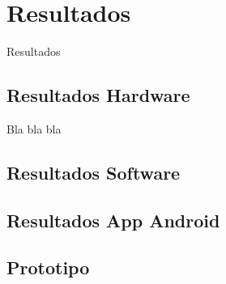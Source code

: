 	\chapter{Resultados}\label{cap.resultados}
	
	Resultados
	\section{Resultados Hardware}
	Bla bla bla
	\section{Resultados Software}
	
	\section{Resultados App Android}
	
	\section{Prototipo}


	\newpage
	$\ $